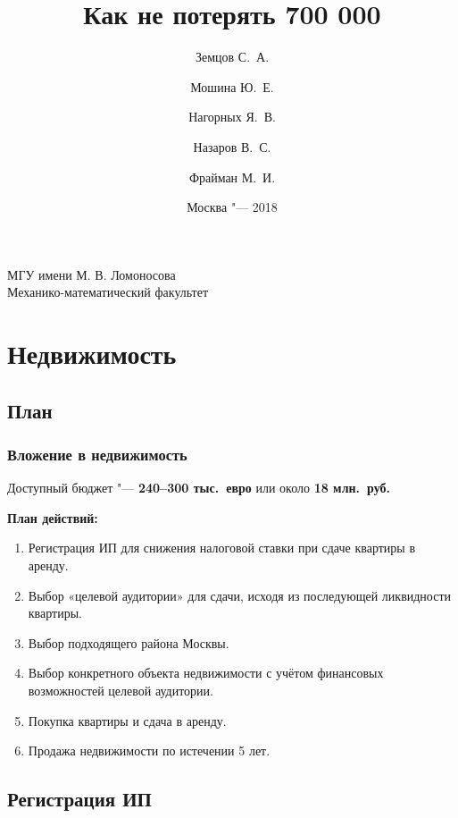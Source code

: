 \documentclass{beamer}
\begin{document}
\title{{Как не потерять 700 000 \EUR}}
\author[%
	Земцов С.\ А. \and Мошина Ю.\ Е. \and Нагорных Я.\ В. \and Назаров В.\ С. \and Фрайман М.\ И.
]{%
	\scriptsize
	Земцов С.\ А. \and Мошина Ю.\ Е. \and Нагорных Я.\ В. \and Назаров В.\ С. \and Фрайман М.\ И.
}
\date{\footnotesize{Москва "--- 2018}}


\begin{frame}
\begin{center}
\footnotesize{МГУ имени М. В. Ломоносова}\\
\footnotesize{Механико-математический факультет}\\\vspace{10pt}
\end{center}
\titlepage
\end{frame}

\section{Недвижимость}

	\subsection{План}
	
		\begin{frame}
			\frametitle{Вложение в недвижимость}
			
			Доступный бюджет "--- \textbf{240--300 тыс.\ евро} или около \textbf{18 млн.\ руб.}
			
			\vspace{\baselineskip}
			\textbf{План действий:}
			\begin{enumerate}
			\item Регистрация ИП для снижения налоговой ставки при сдаче квартиры в аренду.
			\item Выбор «целевой аудитории» для сдачи, исходя из последующей ликвидности квартиры.
			\item Выбор подходящего района Москвы.
			\item Выбор конкретного объекта недвижимости с учётом финансовых возможностей целевой аудитории.
			\item Покупка квартиры и сдача в аренду.
			\item Продажа недвижимости по истечении 5 лет.
			\end{enumerate}
		
		\end{frame}

	\subsection{Регистрация ИП}
	
\end{document}
